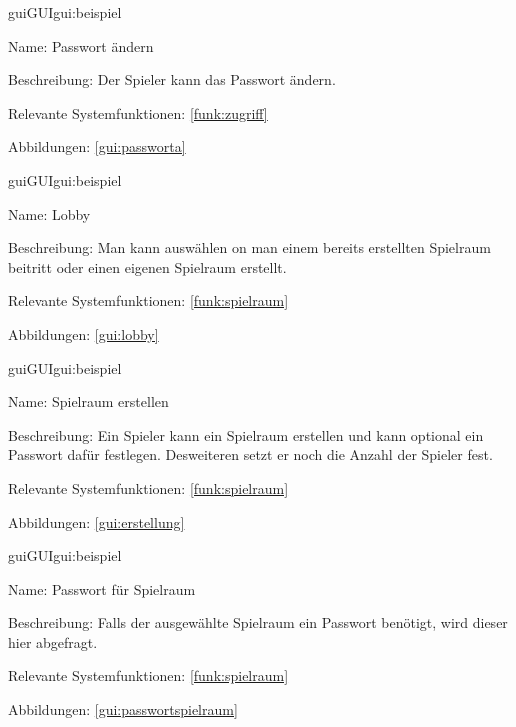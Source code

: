 \begin{description}[leftmargin=5em, style=sameline]	
	\begin{lhp}{gui}{GUI}{gui:beispiel}
		\item[Name:] Passwort ändern
		\item[Beschreibung:] Der Spieler kann das Passwort ändern.
		\item[Relevante Systemfunktionen:] \ref{funk:zugriff}
		\item[Abbildungen:] \ref{gui:passworta}
	\end{lhp}
\end{description}

\begin{description}[leftmargin=5em, style=sameline]	
	\begin{lhp}{gui}{GUI}{gui:beispiel}
		\item[Name:] Lobby
		\item[Beschreibung:] Man kann auswählen on man einem bereits erstellten Spielraum beitritt oder einen eigenen Spielraum erstellt.
		\item[Relevante Systemfunktionen:] \ref{funk:spielraum}
		\item[Abbildungen:] \ref{gui:lobby}
	\end{lhp}
\end{description}

\begin{description}[leftmargin=5em, style=sameline]	
	\begin{lhp}{gui}{GUI}{gui:beispiel}
		\item[Name:] Spielraum erstellen
		\item[Beschreibung:] Ein Spieler kann ein Spielraum erstellen und kann optional ein Passwort dafür festlegen. Desweiteren setzt er noch die Anzahl der Spieler fest.
		\item[Relevante Systemfunktionen:] \ref{funk:spielraum}
		\item[Abbildungen:] \ref{gui:erstellung}
	\end{lhp}
\end{description}

\begin{description}[leftmargin=5em, style=sameline]	
	\begin{lhp}{gui}{GUI}{gui:beispiel}
		\item[Name:] Passwort für Spielraum
		\item[Beschreibung:] Falls der ausgewählte Spielraum ein Passwort benötigt, wird dieser hier abgefragt.
		\item[Relevante Systemfunktionen:] \ref{funk:spielraum}
		\item[Abbildungen:] \ref{gui:passwortspielraum}
	\end{lhp}
\end{description}

